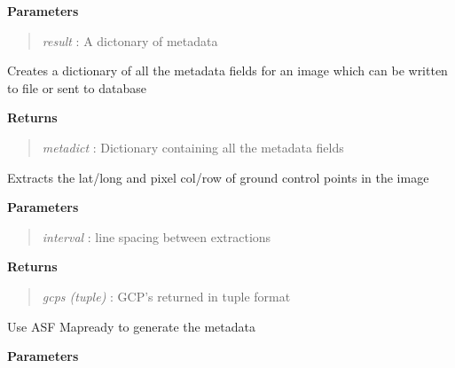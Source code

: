 \documentclass[letterpaper,10pt,openany,oneside]{sphinxmanual}
\begin{document}
\begin{fulllineitems}
\begin{fulllineitems}
\textbf{Parameters}
\begin{quote}

\emph{result} : A dictonary of metadata
\end{quote}

\end{fulllineitems}


\begin{fulllineitems}
\label{code:Metadata.Metadata.createMetaDict}
Creates a dictionary of all the metadata fields for an image
which can be written to file or sent to database

\textbf{Returns}
\begin{quote}

\emph{metadict} : Dictionary containing all the metadata fields
\end{quote}

\end{fulllineitems}


\begin{fulllineitems}
\label{code:Metadata.Metadata.extractGCPs}
Extracts the lat/long and pixel col/row of ground control points in the image

\textbf{Parameters}
\begin{quote}

\emph{interval} : line spacing between extractions
\end{quote}

\textbf{Returns}
\begin{quote}

\emph{gcps (tuple)} : GCP's returned in tuple format
\end{quote}

\end{fulllineitems}


\begin{fulllineitems}
\label{code:Metadata.Metadata.getASFMetaCorners}
Use ASF Mapready to generate the metadata

\textbf{Parameters}
\begin{quote}


\end{quote}
\end{fulllineitems}
\end{fulllineitems}
\end{document}

